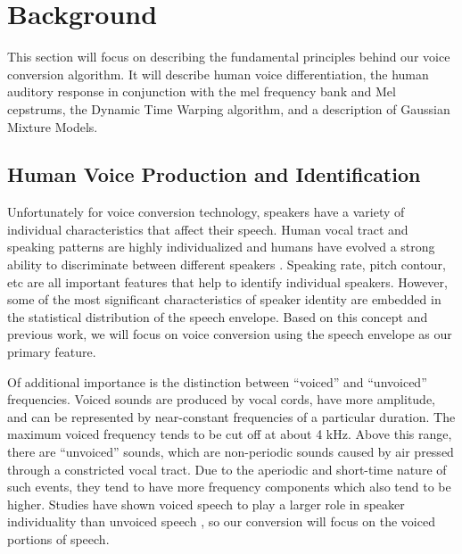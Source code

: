 
\section{Background}
\label{sec:background}
This section will focus on describing the fundamental principles behind our voice conversion algorithm. It will describe human voice differentiation, the human auditory response in conjunction with the mel frequency bank and Mel cepstrums, the Dynamic Time Warping algorithm, and a description of Gaussian Mixture Models.
\subsection{Human Voice Production and Identification}

Unfortunately for voice conversion technology, speakers have a variety of individual characteristics that affect their speech. Human vocal tract and speaking patterns are highly individualized and humans have evolved a strong ability to discriminate between different speakers \cite{latinus2011human}.  Speaking rate, pitch contour, etc are all important features that help to identify individual speakers. However, some of the most significant characteristics of speaker identity are embedded in the statistical distribution of the speech envelope\cite{reynolds1995robust}. Based on this concept and previous work, we will focus on voice conversion using the speech envelope as our primary feature.

Of additional importance is the distinction between ``voiced'' and ``unvoiced'' frequencies. Voiced sounds are produced by vocal cords, have more amplitude, and can be represented by near-constant frequencies of a particular duration. The maximum voiced frequency tends to be cut off at about 4 kHz. Above this range, there are ``unvoiced'' sounds, which are non-periodic sounds caused by air pressed through a constricted vocal tract. Due to the aperiodic and short-time nature of such events, they tend to have more frequency components which also tend to be higher\cite{bachu2008separation}. Studies have shown voiced speech to play a larger role in speaker individuality than unvoiced speech \cite{stylianou1998continuous}, so our conversion will focus on the voiced portions of speech.

